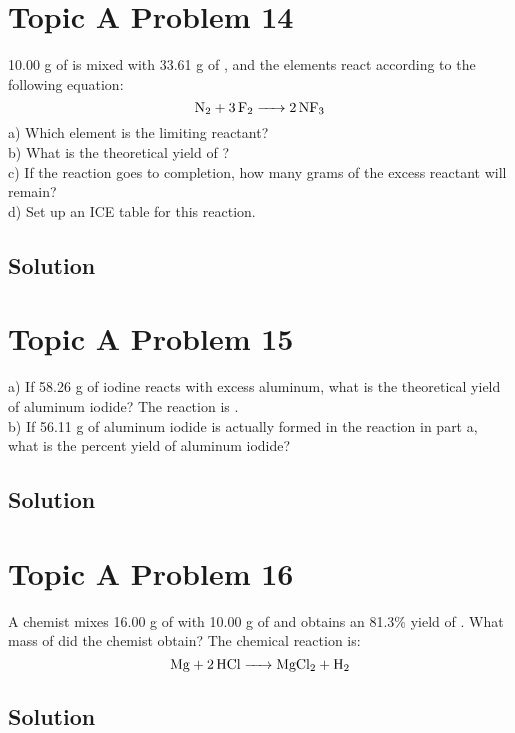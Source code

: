 \documentclass[10pt]{article}
\begin{document}
    \section{Topic A Problem 14}
        10.00 g of  is mixed with 33.61 g of , and the elements react according to the following equation: 
        \begin{equation}
            \ce{N2 + 3F2 -> 2NF3}
        \end{equation}
        a) Which element is the limiting reactant?\\
        b) What is the theoretical yield of ?\\
        c) If the reaction goes to completion, how many grams of the excess reactant will remain?\\
        d) Set up an ICE table for this reaction.

        \subsection{Solution}

    \pagebreak
    \section{Topic A Problem 15}
        a) If 58.26 g of iodine reacts with excess aluminum, what is the theoretical yield of aluminum iodide? 
        The reaction is .\\
        b) If 56.11 g of aluminum iodide is actually formed in the reaction in part a, what is the percent yield of aluminum iodide?

        \subsection{Solution}

    \pagebreak
    \section{Topic A Problem 16}
        A chemist mixes 16.00 g of  with 10.00 g of  and obtains an 81.3\% yield of .
        What mass of  did the chemist obtain? 
        The chemical reaction is:
        \begin{equation}
            \ce{Mg + 2 HCl -> MgCl2 + H2}
        \end{equation}

        \subsection{Solution}
\end{document}
